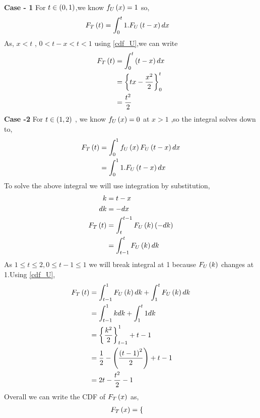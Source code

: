 \documentclass[journal,12pt,twocolumn]{IEEEtran}
\begin{document}
\begin{enumerate}[label=\thesection.\arabic*
,ref=\thesection.\theenumi]
\begin{enumerate}[label=\thesection.\arabic*
,ref=\thesection.\theenumi]
\begin{align}
   \end{align}
\textbf{Case - 1} For $ t \in \left(0,1\right) $,we know $f_{U}\left(x\right) = 1$ so,
  \begin{align}
          F_{T}\left(t\right) &= \int_{0}^{t}1.F_{U}\left(t-x\right)dx
  \end{align}
        As, $x<t$ , $ 0<t-x< t<1$ using \eqref{cdf_U},we can write
  \begin{align}
         F_{T}\left(t\right) &= \int_{0}^{t}\left(t-x\right)dx\\
                       &= \left\{ tx - \frac{x^2}{2}\right\}_{0}^{t}\\
                       &= \frac{t^{2}}{2}
  \end{align}
 \textbf{Case -2} For $ t \in \left(1,2\right)$ , we know $f_{U}\left(x\right) = 0$ at $ x > 1$ ,so the integral solves down to,
  \begin{align}
          F_{T}\left(t\right) &= \int_{0}^{1}f_{U}\left(x\right)F_{U}\left(t-x\right)dx\\
                        &= \int_{0}^{1}1.F_{U}\left(t-x\right)dx\\
  \end{align}
   To solve the above integral we will use integration by substitution,
   \begin{align}
            k &= t-x\\
           dk &= -dx\\
           F_{T}\left(t\right) &= \int_{t}^{t-1}F_{U}\left(k\right)\left(-dk\right)\\
                         &= \int_{t-1}^{t}F_{U}\left(k\right)dk
   \end{align}
   As $ 1 \leq t \leq 2 , 0 \leq t-1 \leq 1 $ we will break integral at 1 because $ F_{U}\left(k\right)$ changes at 1.Using \eqref{cdf_U},
   \begin{align}
           F_{T}\left(t\right)  &= \int_{t-1}^{1}F_{U}\left(k\right)dk + \int_{1}^{t}F_{U}\left(k\right)dk \\
                          &= \int_{t-1}^{1}kdk + \int_{1}^{t}1dk\\
                          &= \left\{\frac{k^{2}}{2}\right\}_{t-1}^{1} + t - 1\\
                          &= \frac{1}{2} -\left(\frac{\left(t-1\right)^{2}}{2}\right) + t - 1\\
                          &= 2t - \frac{t^{2}}{2} - 1
   \end{align}
   Overall we can write the CDF of $F_{T}\left(x\right)$ as,
   \begin{align}
           F_{T}\left(x\right) &=   \begin{cases}

\end{cases}
\end{align}
\end{enumerate}
\end{enumerate}
\end{document}
